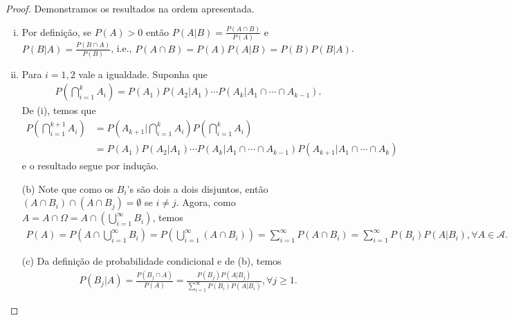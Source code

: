 \documentclass[../Notas.tex]{subfiles}
\begin{document}
\begin{proof}
Demonstramos os resultados na ordem apresentada.
\begin{enumerate}[(i)]
    \item Por definição, se $P(A) > 0$ então $P(A|B) = \displaystyle{\frac{P(A\cap B)}{P(A)}}$ e $P(B|A) = \displaystyle{\frac{P(B\cap A)}{P(B)}}$, i.e., $P(A\cap B) = P(A)P(A|B) = P(B)P(B|A)$.
    \item Para $i=1,2$ vale a igualdade. Suponha que
    \begin{align*}
        P\left( \bigcap_{i=1}^{k}A_i \right) = P(A_1)P(A_2|A_1)\cdots P(A_k|A_1\cap\cdots\cap A_{k-1}).
    \end{align*}
    De (i), temos que 
    \begin{align*}
        P\left( \bigcap_{i=1}^{k+1}A_i \right) &= P\left( A_{k+1}|\bigcap_{i=1}^{k}A_i \right)P\left( \bigcap_{i=1}^{k}A_i \right) \\
        &= P(A_1)P(A_2|A_1)\cdots P(A_k|A_1\cap\cdots\cap A_{k-1})P(A_{k+1}|A_1\cap\cdots\cap A_k)
    \end{align*}
    e o resultado segue por indução.
\end{enumerate}
\begin{itemize}
    \item[(b)] Note que como os $B_i$'s são dois a dois disjuntos, então $(A\cap B_i)\cap(A\cap B_j) = \emptyset$ se $i\neq j$. Agora, como $A = A\cap\Omega = \displaystyle{A\cap \left( \bigcup_{i=1}^{\infty}B_i \right)}$, temos
    \begin{align*}
        P(A) = P\left( A\cap\bigcup_{i=1}^{\infty}B_i \right) = P\left( \bigcup_{i=1}^{\infty}(A\cap B_i) \right) = \sum_{i=1}^{\infty} P(A\cap B_i) = \sum_{i=1}^{\infty}P(B_i)P(A|B_i), \forall A\in\mathcal{A}.
    \end{align*}
    \item[(c)] Da definição de probabilidade condicional e de (b), temos
    \begin{align*}
        P(B_j|A) = \frac{P(B_j\cap A)}{P(A)} = \frac{P(B_j)P(A|B_j)}{\sum_{i=1}^{\infty}P(B_i)P(A|B_i)}, \forall j\geq 1.
    \end{align*}
\end{itemize}
\end{proof}
\end{document}
